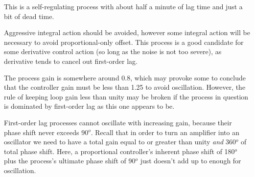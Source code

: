 





This is a self-regulating process with about half a minute of lag time and just a bit of dead time.

\vskip 10pt

Aggressive integral action should be avoided, however some integral action will be necessary to avoid proportional-only offset.  This process is a good candidate for some derivative control action (so long as the noise is not too severe), as derivative tends to cancel out first-order lag.







The process gain is somewhere around 0.8, which may provoke some to conclude that the controller gain must be less than 1.25 to avoid oscillation.  However, the rule of keeping loop gain less than unity may be broken if the process in question is dominated by first-order lag as this one appears to be.

First-order lag processes cannot oscillate with increasing gain, because their phase shift never exceeds 90$^{o}$.  Recall that in order to turn an amplifier into an oscillator we need to have a total gain equal to or greater than unity {\it and} 360$^{o}$ of total phase shift.  Here, a proportional controller's inherent phase shift of 180$^{o}$ plus the process's ultimate phase shift of 90$^{o}$ just doesn't add up to enough for oscillation.




